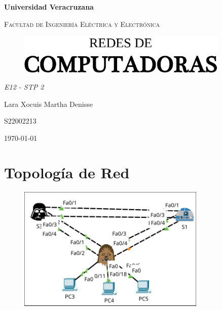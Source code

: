\documentclass[letterpaper,12pt]{article}
\begin{document}
\thispagestyle{empty}
\newpage
\setcounter{page}{1}
\pagestyle{headings}
\begin{sloppypar} 
\begin{titlepage}
    \hspace{2.5cm}
    {\bfseries\LARGE Universidad Veracruzana \par}
    \hspace{2cm}
    {\scshape\Large Facultad de Ingeniería Eléctrica y Electrónica \par}
    \begin{center}
        \vspace{5cm}
        \begin{figure}[H]
            \centering 
            \includegraphics[width=0.9\textwidth]{PORTADA.png}
        \end{figure}
        \vspace{2cm}
        {\itshape\Large E12 - STP 2 \par}
        {\large Lara Xocuis Martha Denisse \par}
        {\large S22002213 \par}
        \vfill
        {\Large \today \par}
    \end{center}
    
\end{titlepage} 

\section{Topología de Red}
\begin{figure}[H]
    \centering 
    \includegraphics[width=0.8\textwidth]{topo.png}
\end{figure}


\end{sloppypar}
\end{document}
